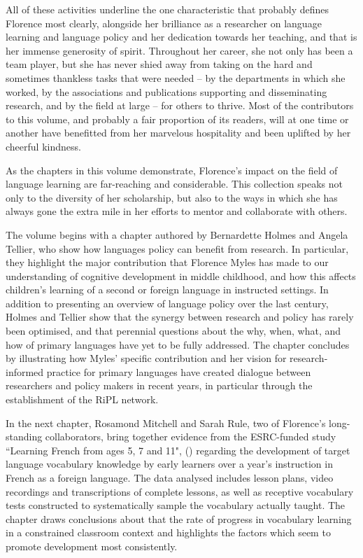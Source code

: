 \documentclass[output=paper]{langscibook}
\begin{document}
All of these activities underline the one characteristic that probably defines Florence most clearly, alongside her brilliance as a researcher on language learning and language policy and her dedication towards her teaching, and that is her immense generosity of spirit. Throughout her career, she not only has been a team player, but she has never shied away from taking on the hard and sometimes thankless tasks that were needed – by the departments in which she worked, by the associations and publications supporting and disseminating research, and by the field at large – for others to thrive. Most of the contributors to this volume, and probably a fair proportion of its readers, will at one time or another have benefitted from her marvelous hospitality and been uplifted by her cheerful kindness. 

As the chapters in this volume demonstrate, Florence’s impact on the field of language learning are far-reaching and considerable. This collection speaks not only to the diversity of her scholarship, but also to the ways in which she has always gone the extra mile in her efforts to mentor and collaborate with others.

\begin{sloppypar}
The volume begins with a chapter authored by Bernardette Holmes and Angela Tellier, who show how languages policy can benefit from research. In particular, they highlight the major contribution that Florence Myles has made to our understanding of cognitive development in middle childhood, and how this affects children’s learning of a second or foreign language in instructed settings. In addition to presenting an overview of language policy over the last century, Holmes and Tellier show that the synergy between research and policy has rarely been optimised, and that perennial questions about the why, when, what, and how of primary languages have yet to be fully addressed. The chapter concludes by illustrating how Myles' specific contribution and her vision for research-in\-formed practice for primary languages have created dialogue between researchers and policy makers in recent years, in particular through the establishment of the RiPL network.
\end{sloppypar}

In the next chapter, Rosamond Mitchell and Sarah Rule, two of Florence’s long-standing collaborators, bring together evidence from the ESRC-funded study ``Learning French from ages 5, 7 and 11", (\citealt{MylesEtAl2012, Myles2017}) regarding the development of target language vocabulary knowledge by early learners over a year’s instruction in French as a foreign language. The data analysed includes lesson plans, video recordings and transcriptions of complete lessons, as well as receptive vocabulary tests constructed to systematically sample the vocabulary actually taught. The chapter draws conclusions about that the rate of progress in vocabulary learning in a constrained classroom context and highlights the factors which seem to promote development most consistently.
\end{document}
